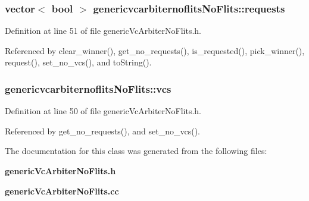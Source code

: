 \subsubsection[{requests}]{\setlength{\rightskip}{0pt plus 5cm}vector$<$ bool $>$ {\bf genericvcarbiternoflitsNoFlits::requests}\hspace{0.3cm}{\tt  [private]}}\label{classgenericvcarbiternoflitsNoFlits_44f82d31aa430702968d2f78d2faca14}




Definition at line 51 of file genericVcArbiterNoFlits.h.

Referenced by clear\_\-winner(), get\_\-no\_\-requests(), is\_\-requested(), pick\_\-winner(), request(), set\_\-no\_\-vcs(), and toString().
\subsubsection[{vcs}]{ {\bf genericvcarbiternoflitsNoFlits::vcs}\hspace{0.3cm}{\tt  [private]}}\label{classgenericvcarbiternoflitsNoFlits_773952bc5d23a4b91dcfb3450bfae84d}




Definition at line 50 of file genericVcArbiterNoFlits.h.

Referenced by get\_\-no\_\-requests(), and set\_\-no\_\-vcs().

The documentation for this class was generated from the following files:\begin{CompactItemize}
\item 
{\bf genericVcArbiterNoFlits.h}\item 
{\bf genericVcArbiterNoFlits.cc}\end{CompactItemize}
